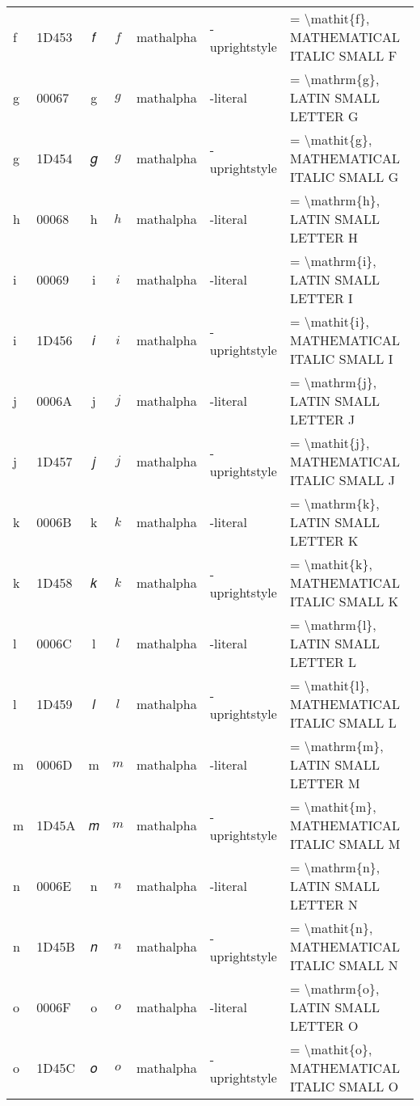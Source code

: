 \documentclass[a4paper,landscape]{article}
\begin{document}
\begin{longtable}{llcclll}
f & 1D453 & 𝑓 & $f$ & mathalpha & -uprightstyle & = \textbackslash{}mathit\{f\}, MATHEMATICAL ITALIC SMALL F \\
g & 00067 & g & $g$ & mathalpha & -literal & = \textbackslash{}mathrm\{g\}, LATIN SMALL LETTER G \\
g & 1D454 & 𝑔 & $g$ & mathalpha & -uprightstyle & = \textbackslash{}mathit\{g\}, MATHEMATICAL ITALIC SMALL G \\
h & 00068 & h & $h$ & mathalpha & -literal & = \textbackslash{}mathrm\{h\}, LATIN SMALL LETTER H \\
i & 00069 & i & $i$ & mathalpha & -literal & = \textbackslash{}mathrm\{i\}, LATIN SMALL LETTER I \\
i & 1D456 & 𝑖 & $i$ & mathalpha & -uprightstyle & = \textbackslash{}mathit\{i\}, MATHEMATICAL ITALIC SMALL I \\
j & 0006A & j & $j$ & mathalpha & -literal & = \textbackslash{}mathrm\{j\}, LATIN SMALL LETTER J \\
j & 1D457 & 𝑗 & $j$ & mathalpha & -uprightstyle & = \textbackslash{}mathit\{j\}, MATHEMATICAL ITALIC SMALL J \\
k & 0006B & k & $k$ & mathalpha & -literal & = \textbackslash{}mathrm\{k\}, LATIN SMALL LETTER K \\
k & 1D458 & 𝑘 & $k$ & mathalpha & -uprightstyle & = \textbackslash{}mathit\{k\}, MATHEMATICAL ITALIC SMALL K \\
l & 0006C & l & $l$ & mathalpha & -literal & = \textbackslash{}mathrm\{l\}, LATIN SMALL LETTER L \\
l & 1D459 & 𝑙 & $l$ & mathalpha & -uprightstyle & = \textbackslash{}mathit\{l\}, MATHEMATICAL ITALIC SMALL L \\
m & 0006D & m & $m$ & mathalpha & -literal & = \textbackslash{}mathrm\{m\}, LATIN SMALL LETTER M \\
m & 1D45A & 𝑚 & $m$ & mathalpha & -uprightstyle & = \textbackslash{}mathit\{m\}, MATHEMATICAL ITALIC SMALL M \\
n & 0006E & n & $n$ & mathalpha & -literal & = \textbackslash{}mathrm\{n\}, LATIN SMALL LETTER N \\
n & 1D45B & 𝑛 & $n$ & mathalpha & -uprightstyle & = \textbackslash{}mathit\{n\}, MATHEMATICAL ITALIC SMALL N \\
o & 0006F & o & $o$ & mathalpha & -literal & = \textbackslash{}mathrm\{o\}, LATIN SMALL LETTER O \\
o & 1D45C & 𝑜 & $o$ & mathalpha & -uprightstyle & = \textbackslash{}mathit\{o\}, MATHEMATICAL ITALIC SMALL O \\

\end{longtable}
\end{document}
